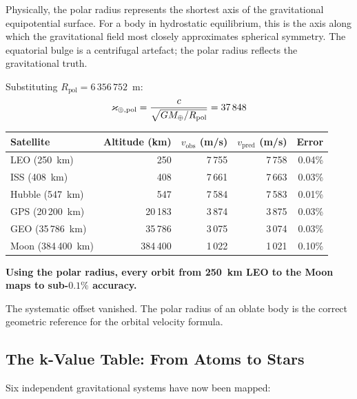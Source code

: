 Physically, the polar radius represents the shortest axis of the gravitational equipotential surface.  For a body in hydrostatic equilibrium, this is the axis along which the gravitational field most closely approximates spherical symmetry. The equatorial bulge is a centrifugal artefact; the polar radius reflects the gravitational truth.

Substituting $R_{\text{pol}} = 6\,356\,752$~m:
\begin{equation}
  \varkappa_{\oplus,\text{pol}} = \frac{c}{\sqrt{GM_\oplus / R_{\text{pol}}}} = 37\,848
\end{equation}

\begin{center}
\begin{tabular}{lrrrr}
\toprule
\textbf{Satellite} & Altitude (km) & $v_{\text{obs}}$ (m/s) & $v_{\text{pred}}$ (m/s) & Error \\
\midrule
LEO (250~km)   &    250 & 7\,755 & 7\,758 & 0.04\% \\
ISS (408~km)   &    408 & 7\,661 & 7\,663 & 0.03\% \\
Hubble (547~km)  &    547 & 7\,584 & 7\,583 & 0.01\% \\
GPS (20\,200~km) & 20\,183 & 3\,874 & 3\,875 & 0.03\% \\
GEO (35\,786~km) & 35\,786 & 3\,075 & 3\,074 & 0.03\% \\
Moon (384\,400~km)& 384\,400 & 1\,022 & 1\,021 & 0.10\% \\
\bottomrule
\end{tabular}
\end{center}

\textbf{Using the polar radius, every orbit from 250~km LEO to the Moon maps to sub-$0.1\%$ accuracy.}

The systematic offset vanished.  The polar radius of an oblate body is the correct geometric reference for the orbital velocity formula.

\subsection{The k-Value Table: From Atoms to Stars}

Six independent gravitational systems have now been mapped:


